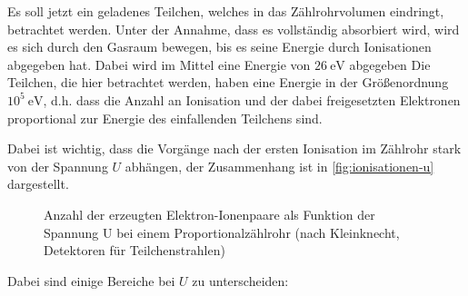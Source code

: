 Es soll jetzt ein geladenes Teilchen, welches in das Zählrohrvolumen eindringt, betrachtet werden. Unter
der Annahme, dass es vollständig absorbiert wird, wird es sich durch den Gasraum bewegen, bis es seine 
Energie durch Ionisationen abgegeben hat. Dabei wird im Mittel eine Energie von $26\ \si{\eV}$ 
abgegeben 
Die Teilchen, die hier betrachtet werden, haben eine Energie in der Größenordnung $10^5\ \si{\eV}$, d.h. 
dass die Anzahl an Ionisation und der dabei freigesetzten Elektronen proportional zur Energie des 
einfallenden Teilchens sind.

\noindent
Dabei ist wichtig, dass die Vorgänge nach der ersten Ionisation im Zählrohr stark von der Spannung $U$ 
abhängen, der Zusammenhang ist in \autoref{fig:ionisationen-u} dargestellt.
\begin{figure}[H]
	\centering
	\caption{Anzahl der erzeugten Elektron-Ionenpaare als Funktion der Spannung U bei einem
	Proportionalzählrohr (nach Kleinknecht, Detektoren für Teilchenstrahlen) \cite{sample}}
	\label{fig:ionisationen-u}
\end{figure}
Dabei sind einige Bereiche bei $U$ zu unterscheiden:
